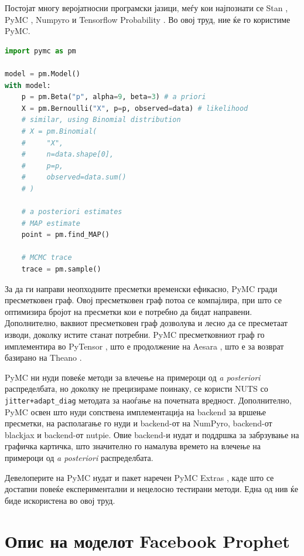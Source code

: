 \documentclass[12pt]{article}
\numberwithin{equation}{section}
\begin{document}
Постојат многу веројатносни програмски јазици, меѓу кои најпознати се Stan \cite{carpenter2017stan}, PyMC \cite{abril2023pymc}, Numpyro \cite{bingham2019pyro, phan2019composable} и Tensorflow Probability \cite{tensorflow2015-whitepaper}. Во овој труд, ние ќе го користиме PyMC.

\begin{lstlisting}[language=Python,caption=Фрлање паричка моделирано во PyMC]
import pymc as pm

model = pm.Model()
with model:
    p = pm.Beta("p", alpha=9, beta=3) # a priori
    X = pm.Bernoulli("X", p=p, observed=data) # likelihood
    # similar, using Binomial distribution
    # X = pm.Binomial(
    #     "X",
    #     n=data.shape[0],
    #     p=p,
    #     observed=data.sum()
    # )

    # a posteriori estimates
    # MAP estimate
    point = pm.find_MAP()

    # MCMC trace
    trace = pm.sample()
\end{lstlisting}

За да ги направи неопходните пресметки временски ефикасно, PyMC гради пресметковен граф. Овој пресметковен граф потоа се компајлира, при што се оптимизира бројот на пресметки кои е потребно да бидат направени. Дополнително, ваквиот пресметковен граф дозволува и лесно да се пресметаат изводи, доколку истите станат потребни. PyMC пресметковниот граф го имплементира во PyTensor \cite{pytensor2022}, што е продолжение на Aesara \cite{T_Willard_Aesara_2023}, што е за возврат базирано на Theano \cite{al2016theano}.

PyMC ни нуди повеќе методи за влечење на примероци од \textit{a posteriori} распределбата, но доколку не прецизираме поинаку, се користи NUTS со \verb|jitter+adapt_diag| методата за наоѓање на почетната вредност. Дополнително, PyMC освен што нуди сопствена имплементација на backend за вршење пресметки, на располагање го нуди и backend-от на NumPyro, backend-от blackjax и backend-от nutpie. Овие backend-и нудат и поддршка за забрзување на графичка картичка, што значително го намалува времето на влечење на примероци од \textit{a posteriori} распределбата.

Девелоперите на PyMC нудат и пакет наречен PyMC Extras \cite{pymcextras2022}, каде што се достапни повеќе експериментални и нецелосно тестирани методи. Една од нив ќе биде искористена во овој труд.

\newpage

\section{Опис на моделот Facebook Prophet}
\end{document}
